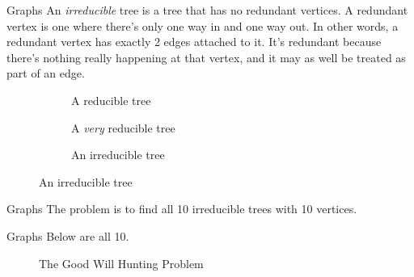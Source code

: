 \documentclass{beamer}
\begin{document}
    \begin{frame}{Graphs}
        An \textit{irreducible} tree is a tree that has no redundant vertices. A redundant
        vertex is one where there's only one way in and one way out. In other words, a redundant
        vertex has exactly 2 edges attached to it. It's redundant because there's nothing really
        happening at that vertex, and it may as well be treated as part of an edge.
        \begin{figure}
            \centering
            \begin{subfigure}[b]{0.32\textwidth}
                \centering
                \caption{A reducible tree}
                \label{fig:reducible_tree_002}
            \end{subfigure}
            \begin{subfigure}[b]{0.32\textwidth}
                \centering
                \caption{A \textit{very} reducible tree}
                \label{fig:reducible_tree_001}
            \end{subfigure}
            \begin{subfigure}[b]{0.32\textwidth}
                \centering
                \caption{An irreducible tree}
                \label{fig:irreducible_tree_001}
            \end{subfigure}
        \end{figure}
    \end{frame}
    \begin{frame}{Graphs}
        The problem is to find all 10 irreducible trees with 10 vertices.
    \end{frame}
    \begin{frame}{Graphs}
        Below are all 10.
        \begin{figure}
            \centering
            \resizebox{!}{0.7\textheight}{}
            \caption{The Good Will Hunting Problem}
            \label{fig:goodwill}
        \end{figure}
    \end{frame}
\end{document}
